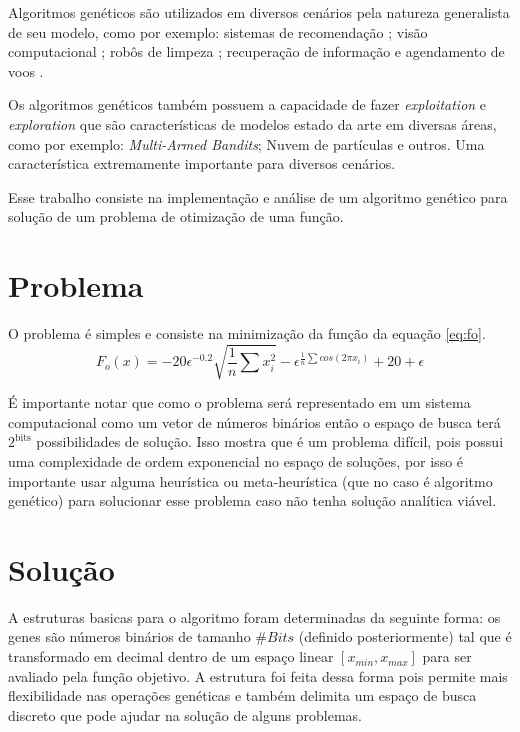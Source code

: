 \documentclass[11pt]{article}
\begin{document}
Algoritmos genéticos são utilizados em diversos cenários pela natureza generalista de seu modelo, como por exemplo: sistemas de recomendação \cite{naruchitparames2011friend,silva2010graph}; visão computacional \cite{gong2004quadtree}; robôs de limpeza \cite{yakoubi2016path}; recuperação de informação \cite{vrajitoru1998crossover} e agendamento de voos \cite{lee2007multi}.

Os algoritmos genéticos também possuem a capacidade de fazer \emph{exploitation} e \emph{exploration} que são características de modelos estado da arte em diversas áreas, como por exemplo: \emph{Multi-Armed Bandits}; Nuvem de partículas e outros. Uma característica extremamente importante para diversos cenários.

Esse trabalho consiste na implementação e análise de um algoritmo genético para solução de um problema de otimização de uma função.

\section{Problema}
\label{sec:orgf659f66}

O problema é simples e consiste na minimização da função da equação \ref{eq:fo}. 
\begin{equation}
\label{eq:fo}
F_o(x) = -20\epsilon^{-0.2}\sqrt{\frac{1}{n}\sum x_i^2} - \epsilon^{\frac{1}{n}\sum cos(2\pi x_i)} + 20 + \epsilon
\end{equation}

É importante notar que como o problema será representado em um sistema computacional como um vetor de números binários então o espaço de busca terá \(2^{\text{bits}}\) possibilidades de solução. Isso mostra que é um problema difícil, pois possui uma complexidade de ordem exponencial no espaço de soluções, por isso é importante usar alguma heurística ou meta-heurística (que no caso é algoritmo genético) para solucionar esse problema caso não tenha solução analítica viável.

\section{Solução}
\label{sec:orgccd068f}

A estruturas basicas para o algoritmo foram determinadas da seguinte forma: os genes são números binários de tamanho \(\# Bits\) (definido posteriormente) tal que é transformado em decimal dentro de um espaço linear \([x_{min},x_{max}]\) para ser avaliado pela função objetivo. A estrutura foi feita dessa forma pois permite mais flexibilidade nas operações genéticas e também delimita um espaço de busca discreto que pode ajudar na solução de alguns problemas. 
\end{document}

